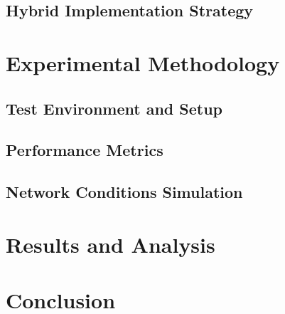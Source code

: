 \documentclass[journal=tches,final]{iacrtrans}
\begin{document}
\subsection{Hybrid Implementation Strategy}

\section{Experimental Methodology}

\subsection{Test Environment and Setup}

\subsection{Performance Metrics}

\subsection{Network Conditions Simulation}


\section{Results and Analysis}

\section{Conclusion}



\end{document}
